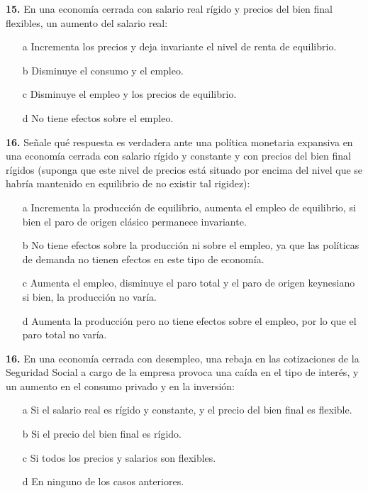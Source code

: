 \documentclass{nuevotema}
\begin{document}
\textbf{15.} En una economía cerrada con salario real rígido y precios del bien final flexibles, un aumento del salario real:
\begin{itemize}
	\item[a] Incrementa los precios y deja invariante el nivel de renta de equilibrio.
	\item[b] Disminuye el consumo y el empleo.
	\item[c] Disminuye el empleo y los precios de equilibrio.
	\item[d] No tiene efectos sobre el empleo.
\end{itemize}

\textbf{16.} Señale qué respuesta es verdadera ante una política monetaria expansiva en una economía cerrada con salario rígido y constante y con precios del bien final rígidos (suponga que este nivel de precios está situado por encima del nivel que se habría mantenido en equilibrio de no existir tal rigidez):
\begin{itemize}
	\item[a] Incrementa la producción de equilibrio, aumenta el empleo de equilibrio, si bien el paro de origen clásico permanece invariante.
	\item[b] No tiene efectos sobre la producción ni sobre el empleo, ya que las políticas de demanda no tienen efectos en este tipo de economía.
	\item[c] Aumenta el empleo, disminuye el paro total y el paro de origen keynesiano si bien, la producción no varía.
	\item[d] Aumenta la producción pero no tiene efectos sobre el empleo, por lo que el paro total no varía.
\end{itemize}

\textbf{16.} En una economía cerrada con desempleo, una rebaja en las cotizaciones de la Seguridad Social a cargo de la empresa provoca una caída en el tipo de interés, y un aumento en el consumo privado y en la inversión:

\begin{itemize}
	\item[a] Si el salario real es rígido y constante, y el precio del bien final es flexible.
	\item[b] Si el precio del bien final es rígido.
	\item[c] Si todos los precios y salarios son flexibles.
	\item[d] En ninguno de los casos anteriores.
\end{itemize}
\end{document}
